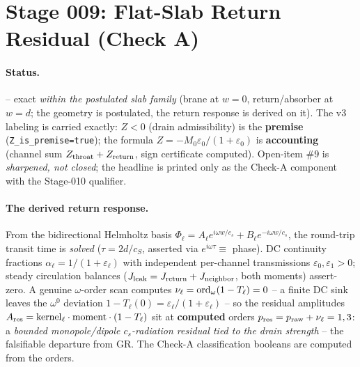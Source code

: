 \section{Stage 009: Flat-Slab Return Residual (Check A)}

\claimstatus{\StatusExactClosure}

\paragraph{Status.}
\StatusExactClosure{} -- exact \emph{within the postulated slab family} (brane
at \(w=0\), return/absorber at \(w=d\); the geometry is postulated, the return
response is derived on it). The v3 labeling is carried exactly: \(Z<0\) (drain
admissibility) is the \textbf{premise} (\texttt{Z\_is\_premise=true}); the
formula \(Z=-M_0\varepsilon_0/(1+\varepsilon_0)\) is \textbf{accounting}
(channel sum \(Z_{\rm throat}+Z_{\rm return}\), sign certificate computed).
Open-item \#9 is \emph{sharpened, not closed}; the headline is printed only as
the Check-A component with the Stage-010 qualifier.

\paragraph{The derived return response.}
From the bidirectional Helmholtz basis
\(\Phi_\ell=A_\ell e^{i\omega w/c_s}+B_\ell e^{-i\omega w/c_s}\), the
round-trip transit time is \emph{solved} (\(\tau=2d/c_S\), asserted via
\(e^{i\omega\tau}\equiv\) phase). DC continuity fractions
\(\alpha_\ell=1/(1+\varepsilon_\ell)\) with independent per-channel
transmissions \(\varepsilon_0,\varepsilon_1>0\); steady circulation balances
(\(J_{\rm leak}=J_{\rm return}+J_{\rm neighbor}\), both moments) assert-zero.
A genuine \(\omega\)-order scan computes
\(\nu_\ell={\rm ord}_\omega(1-T_\ell)=0\) -- a finite DC sink leaves the
\(\omega^0\) deviation \(1-T_\ell(0)=\varepsilon_\ell/(1+\varepsilon_\ell)\) --
so the residual amplitudes
\(A_{\rm res}=\mathrm{kernel}_\ell\cdot\mathrm{moment}\cdot(1-T_\ell)\) sit at
\textbf{computed} orders \(p_{\rm res}=p_{\rm raw}+\nu_\ell=1,3\): a
\emph{bounded monopole/dipole \(c_s\)-radiation residual tied to the drain
strength} -- the falsifiable departure from GR. The Check-A classification
booleans are computed from the orders.

